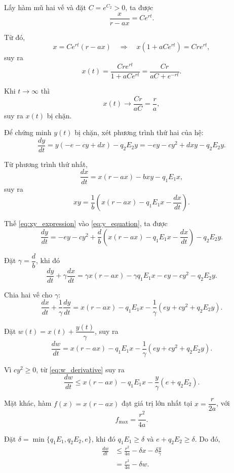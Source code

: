 Lấy hàm mũ hai vế và đặt $C=e^{C_2}>0$, ta được
\[
\frac{x}{r-ax}=Ce^{rt}.
\]

Từ đó,
\[
x
=
Ce^{rt}(r-ax)
\quad\Longrightarrow\quad
x(1+aCe^{rt})
=
Cr e^{rt},
\]
suy ra
\begin{equation}
x(t)
=
\frac{Cr e^{rt}}{1+aCe^{rt}}
=
\frac{Cr}{aC+e^{-rt}}.
\label{eq:logistic_solution}
\end{equation}

Khi $t\to\infty$ thì
\[
x(t)\longrightarrow \frac{Cr}{aC}=\frac{r}{a},
\]
suy ra $x(t)$ bị chặn.

\vspace{0.3cm}

Để chứng minh $y(t)$ bị chặn, xét phương trình thứ hai của hệ:
\begin{equation}
\frac{dy}{dt}
=
y(-e-cy+dx)-q_2E_2y
=
-ey-cy^2+dxy-q_2E_2y.
\label{eq:y_equation}
\end{equation}

Từ phương trình thứ nhất,
\[
\frac{dx}{dt}
=
x(r-ax)-bxy-q_1E_1x,
\]
suy ra
\begin{equation}
xy
=
\frac{1}{b}
\left(
x(r-ax)-q_1E_1x-\frac{dx}{dt}
\right).
\label{eq:xy_expression}
\end{equation}

Thế \eqref{eq:xy_expression} vào \eqref{eq:y_equation}, ta được
\begin{equation}
\frac{dy}{dt}
=
-ey-cy^2
+
\frac{d}{b}
\left(
x(r-ax)-q_1E_1x-\frac{dx}{dt}
\right)
-q_2E_2y.
\end{equation}

Đặt $\gamma=\dfrac{d}{b}$, khi đó
\[
\frac{dy}{dt}
+
\gamma\frac{dx}{dt}
=
\gamma x(r-ax)
-
\gamma q_1E_1x
-
ey-cy^2-q_2E_2y.
\]

Chia hai vế cho $\gamma$:
\[
\frac{dx}{dt}
+
\frac{1}{\gamma}\frac{dy}{dt}
=
x(r-ax)
-
q_1E_1x
-
\frac{1}{\gamma}
\left(
ey+cy^2+q_2E_2y
\right).
\]

Đặt $w(t)=x(t)+\dfrac{y(t)}{\gamma}$, suy ra
\begin{equation}
\frac{dw}{dt}
=
x(r-ax)
-
q_1E_1x
-
\frac{1}{\gamma}
\left(
ey+cy^2+q_2E_2y
\right).
\label{eq:w_derivative}
\end{equation}

Vì $cy^2\geq 0$, từ \eqref{eq:w_derivative} suy ra
\[
\frac{dw}{dt}
\leq
x(r-ax)-q_1E_1x
-\frac{y}{\gamma}(e+q_2E_2).
\]

Mặt khác, hàm $f(x)=x(r-ax)$ đạt giá trị lớn nhất tại
$x=\dfrac{r}{2a}$, với
\[
f_{\max}=\frac{r^2}{4a}.
\]

Đặt $\delta=\min\{q_1E_1,q_2E_2,e\}$, khi đó
$q_1E_1\geq\delta$ và $e+q_2E_2\geq\delta$. Do đó,
\begin{align}
\frac{dw}{dt}
&\leq
\frac{r^2}{4a}
-\delta x
-\delta\frac{y}{\gamma}
\nonumber\\
&=
\frac{r^2}{4a}
-\delta w.
\end{align}

